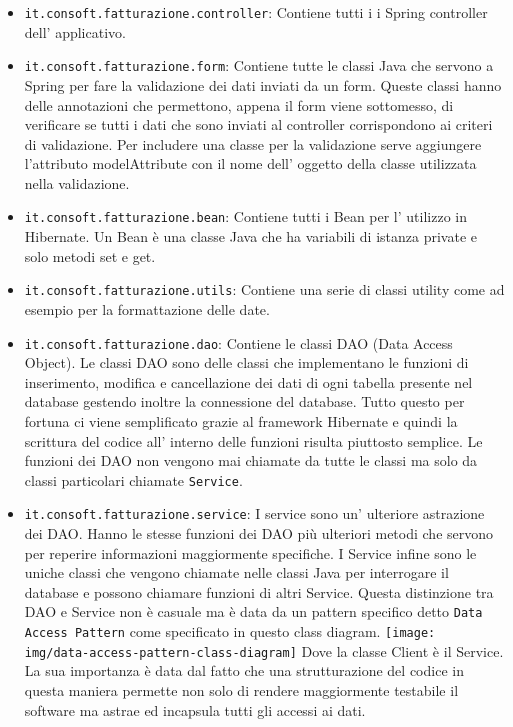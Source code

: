 \documentclass[12pt]{book}
\begin{document}
\begin{itemize}
    \item \texttt{it.consoft.fatturazione.controller}: Contiene tutti i 
        i Spring controller dell' applicativo.
    \item \texttt{it.consoft.fatturazione.form}: Contiene tutte le classi Java 
        che servono a Spring per fare la validazione dei dati inviati da un 
        form. Queste classi hanno delle annotazioni che permettono, appena 
        il form viene sottomesso, di verificare se tutti i dati che sono inviati
        al controller corrispondono ai criteri di validazione.
        Per includere una classe per la validazione serve aggiungere l'attributo
        modelAttribute con il nome dell' oggetto della classe utilizzata nella
        validazione.
    \item \texttt{it.consoft.fatturazione.bean}: Contiene tutti i Bean per 
        l' utilizzo in Hibernate. Un Bean è una classe Java che ha variabili
        di istanza private e solo metodi set e get.
    \item \texttt{it.consoft.fatturazione.utils}: Contiene una serie di classi
        utility come ad esempio per la formattazione delle date.
    \item \texttt{it.consoft.fatturazione.dao}: Contiene le classi DAO (Data
        Access Object). Le classi DAO sono delle classi che implementano 
        le funzioni di inserimento, modifica e cancellazione dei dati di ogni 
        tabella presente nel database gestendo inoltre la connessione del
        database. Tutto questo per fortuna ci viene semplificato grazie 
        al framework Hibernate e quindi la scrittura del codice all' interno 
        delle funzioni risulta piuttosto semplice.
        Le funzioni dei DAO non vengono mai chiamate da tutte le classi ma 
        solo da classi particolari chiamate \texttt{Service}.
    \item \texttt{it.consoft.fatturazione.service}: I service sono un' ulteriore
        astrazione dei DAO\@. 
        Hanno le stesse funzioni dei DAO più ulteriori metodi che servono per 
        reperire informazioni maggiormente specifiche.
        I Service infine sono le uniche classi che vengono chiamate nelle classi
        Java per interrogare il database e possono chiamare funzioni di altri
        Service.
        Questa distinzione tra DAO e Service non è casuale ma è data da un 
        pattern specifico detto \texttt{Data Access Pattern} come specificato
        in questo class diagram.
        \newline
        \newline
        \texttt{[image: img/data-access-pattern-class-diagram]}
        \newline
        Dove la classe Client è il Service. 
        La sua importanza è data dal fatto che una strutturazione del codice 
        in questa maniera permette non solo di rendere maggiormente testabile 
        il software ma astrae ed incapsula tutti gli accessi ai dati.
\end{itemize}
\end{document}
